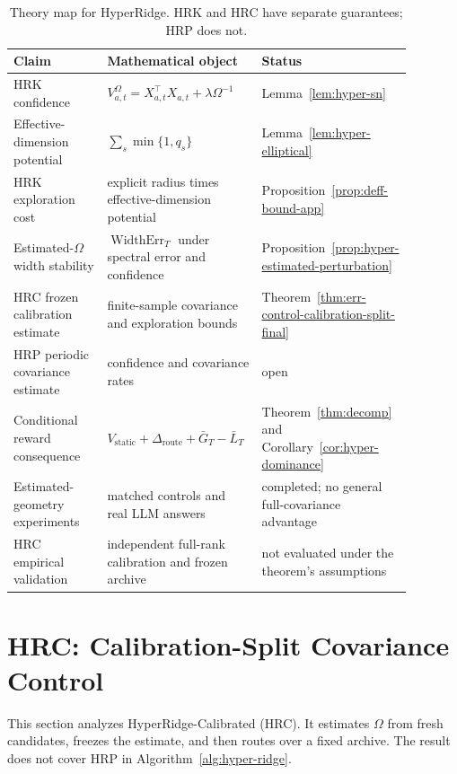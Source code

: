 \documentclass{article} %
\begin{document}
\begin{table}[h]
\centering
\small
\begin{tabular}{
p{0.24\linewidth}
p{0.39\linewidth}
p{0.25\linewidth}}
\toprule
Claim & Mathematical object & Status \\
\midrule
HRK confidence & \(V_{a,t}^{\Omega}=X_{a,t}^{\top}X_{a,t}+\lambda\Omega^{-1}\) & Lemma~\ref{lem:hyper-sn} \\
Effective-dimension potential & \(\sum_s \min\{1,q_s\}\) & Lemma~\ref{lem:hyper-elliptical} \\
HRK exploration cost & explicit radius times effective-dimension potential & Proposition~\ref{prop:deff-bound-app} \\
Estimated-\(\Omega\) width stability & \(\operatorname{WidthErr}_T\) under spectral error and confidence & Proposition~\ref{prop:hyper-estimated-perturbation} \\
HRC frozen calibration estimate & finite-sample covariance and exploration bounds & Theorem~\ref{thm:err-control-calibration-split-final} \\
HRP periodic covariance estimate & confidence and covariance rates & open \\
Conditional reward consequence & \(V_{\mathrm{static}}+\Delta_{\mathrm{route}}+\bar G_T-\bar L_T\) & Theorem~\ref{thm:decomp} and Corollary~\ref{cor:hyper-dominance} \\
Estimated-geometry experiments & matched controls and real LLM answers & completed; no general full-covariance advantage \\
HRC empirical validation & independent full-rank calibration and frozen archive & not evaluated under the theorem's assumptions \\
\bottomrule
\end{tabular}
\caption{Theory map for HyperRidge. HRK and HRC have separate guarantees;
HRP does not.}
\label{tab:hyper-theory-map}
\end{table}

\section{HRC: Calibration-Split Covariance Control}
\label{app:err-control-proof}

This section analyzes HyperRidge-Calibrated (HRC). It estimates
\(\Omega\) from fresh candidates, freezes the estimate, and then routes over a
fixed archive. The result does not cover HRP in
Algorithm~\ref{alg:hyper-ridge}.
\end{document}
